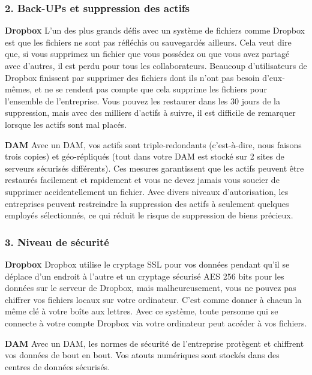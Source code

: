 \subsubsection{2. Back-UPs et suppression des actifs}{}

\textbf{Dropbox} 
\newline
L'un des plus grands défis avec un système de fichiers comme Dropbox est que les fichiers ne sont pas réfléchis ou sauvegardés ailleurs. Cela veut dire que, si vous supprimez un fichier que vous possédez ou que vous avez partagé avec d'autres, il est perdu pour tous les collaborateurs. Beaucoup d'utilisateurs de Dropbox finissent par supprimer des fichiers dont ils n'ont pas besoin d'eux-mêmes, et ne se rendent pas compte que cela supprime les fichiers pour l'ensemble de l'entreprise. Vous pouvez les restaurer dans les 30 jours de la suppression, mais avec des milliers d'actifs à suivre, il est difficile de remarquer lorsque les actifs sont mal placés.
\newline

\textbf{DAM}
\newline
Avec un DAM, vos actifs sont triple-redondants (c'est-à-dire, nous faisons trois copies) et géo-répliqués (tout dans votre DAM est stocké sur 2 sites de serveurs sécurisés différents). Ces mesures garantissent que les actifs peuvent être restaurés facilement et rapidement et vous ne devez jamais vous soucier de supprimer accidentellement un fichier. Avec divers niveaux d'autorisation, les entreprises peuvent restreindre la suppression des actifs à seulement quelques employés sélectionnés, ce qui réduit le risque de suppression de biens précieux.

\subsubsection{3. Niveau de sécurité}{}
\textbf{Dropbox} 
\newline
Dropbox utilise le cryptage SSL pour vos données pendant qu'il se déplace d'un endroit à l'autre et un cryptage sécurisé AES 256 bits pour les données sur le serveur de Dropbox, mais malheureusement, vous ne pouvez pas chiffrer vos fichiers locaux sur votre ordinateur. C'est comme donner à chacun la même clé à votre boîte aux lettres. Avec ce système, toute personne qui se connecte à votre compte Dropbox via votre ordinateur peut accéder à vos fichiers.
\newline

\textbf{DAM}
\newline
Avec un DAM, les normes de sécurité de l'entreprise protègent et chiffrent vos données de bout en bout. Vos atouts numériques sont stockés dans des centres de données sécurisés.

